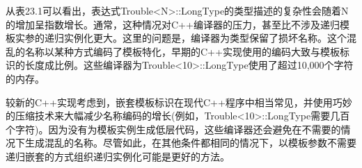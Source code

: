 从表23.1可以看出，表达式Trouble<N>::LongType的类型描述的复杂性会随着N的增加呈指数增长。通常，这种情况对C++编译器的压力，甚至比不涉及递归模板实参的递归实例化更大。这里的问题是，编译器为类型保留了损坏名称。这个混乱的名称以某种方式编码了模板特化，早期的C++实现使用的编码大致与模板标识的长度成比例。这些编译器为Trouble<10>::LongType使用了超过10,000个字符的内存。

较新的C++实现考虑到，嵌套模板标识在现代C++程序中相当常见，并使用巧妙的压缩技术来大幅减少名称编码的增长(例如，Trouble<10>::LongType需要几百个字符)。因为没有为模板实例生成低层代码，这些编译器还会避免在不需要的情况下生成混乱的名称。尽管如此，在其他条件都相同的情况下，以模板参数不需要递归嵌套的方式组织递归实例化可能是更好的方法。

















